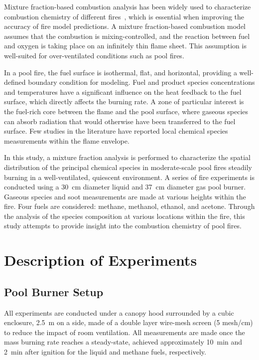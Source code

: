 \documentclass[preprint,review,12pt]{elsarticle}
\begin{document}
Mixture fraction-based combustion analysis has been widely used to characterize combustion chemistry of different fires~\cite{Bilger1977,Peters1984,Floyd2001,Hamins1987,Sivathanu1990}, which is essential when improving the accuracy of fire model predictions. A mixture fraction-based combustion model assumes that the combustion is mixing-controlled, and the reaction between fuel and oxygen is taking place on an infinitely thin flame sheet. This assumption is well-suited for over-ventilated conditions such as pool fires.

In a pool fire, the fuel surface is isothermal, flat, and horizontal, providing a well-defined boundary condition for modeling. Fuel and product species concentrations and temperatures have a significant influence on the heat feedback to the fuel surface, which directly affects the burning rate. A zone of particular interest is the fuel-rich core between the flame and the pool surface, where gaseous species can absorb radiation that would otherwise have been transferred to the fuel surface. Few studies in the literature have reported local chemical species measurements within the flame envelope.

In this study, a mixture fraction analysis is performed to characterize the spatial distribution of the principal chemical species in moderate-scale pool fires steadily burning in a well-ventilated, quiescent environment. A series of fire experiments is conducted using a 30~cm diameter liquid and 37~cm diameter gas pool burner. Gaseous species and soot measurements are made at various heights within the fire. Four fuels are considered: methane, methanol, ethanol, and acetone. Through the analysis of the species composition at various locations within the fire, this study attempts to provide insight into the combustion chemistry of pool fires.


\section{Description of Experiments}
\label{sec:Experiments}

\subsection{Pool Burner Setup}
\label{ssec:Pool_Burner_Setup}
All experiments are conducted under a canopy hood surrounded by a cubic enclosure, 2.5~m on a side, made of a double layer wire-mesh screen (5 mesh/cm) to reduce the impact of room ventilation. All measurements are made once the mass burning rate reaches a steady-state, achieved approximately 10~min and 2~min after ignition for the liquid and methane fuels, respectively.
\end{document}
